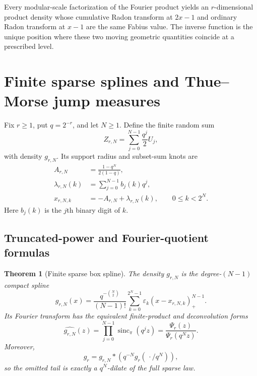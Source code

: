 \documentclass[11pt,oneside]{article}
\numberwithin{equation}{section}
\newtheorem{theorem}{Theorem}[section]
\theoremstyle{definition}
\theoremstyle{remark}
\newcommand{\sincpi}{\operatorname{sinc}_{\pi}}
\newcommand{\eps}{\varepsilon}
\newcommand{\pospart}[1]{\left(#1\right)_{+}}
\begin{document}
\begin{resultbox}
Every modular-scale factorization of the Fourier product yields an
$r$-dimensional product density whose cumulative Radon transform at $2x-1$ and
ordinary Radon transform at $x-1$ are the same Fabius value.  The inverse
function is the unique position where these two moving geometric quantities
coincide at a prescribed level.
\end{resultbox}

\section{Finite sparse splines and Thue--Morse jump measures}
\label{sec:jump-measures}

Fix $r\ge1$, put $q=2^{-r}$, and let $N\ge1$.  Define the finite random sum
\begin{equation}
 Z_{r,N}=\sum_{j=0}^{N-1}\frac{q^j}{2}U_j,                 \label{eq:ZrN}
\end{equation}
with density $g_{r,N}$.  Its support radius and subset-sum knots are
\begin{align}
 A_{r,N}&=\frac{1-q^N}{2(1-q)},                            \label{eq:ArN}\\
 \lambda_{r,N}(k)&=\sum_{j=0}^{N-1}b_j(k)q^j,             \label{eq:lambda-rNk}\\
 x_{r,N,k}&=-A_{r,N}+\lambda_{r,N}(k),
 \qquad 0\le k<2^N.                                      \label{eq:x-rNk}
\end{align}
Here $b_j(k)$ is the $j$th binary digit of $k$.

\subsection{Truncated-power and Fourier-quotient formulas}

\begin{theorem}[Finite sparse box spline]
\label{thm:sparse-box-spline}
The density $g_{r,N}$ is the degree-$(N-1)$ compact spline
\begin{equation}
 \boxed{\displaystyle
 g_{r,N}(x)=\frac{q^{-\binom N2}}{(N-1)!}
 \sum_{k=0}^{2^N-1}\eps_k\pospart{x-x_{r,N,k}}^{N-1}.}    \label{eq:sparse-truncated-power}
\end{equation}
Its Fourier transform has the equivalent finite-product and deconvolution
forms
\begin{equation}
 \boxed{\displaystyle
 \widehat{g_{r,N}}(z)
 =\prod_{j=0}^{N-1}\sincpi(q^jz)
 =\frac{\Psi_r(z)}{\Psi_r(q^Nz)}.}                        \label{eq:g-rN-Fourier}
\end{equation}
Moreover,
\begin{equation}
 g_r=g_{r,N}*\left(q^{-N}g_r(\,\cdot/q^N)\right),         \label{eq:exact-tail-convolution}
\end{equation}
so the omitted tail is exactly a $q^N$-dilate of the full sparse law.
\end{theorem}
\end{document}
